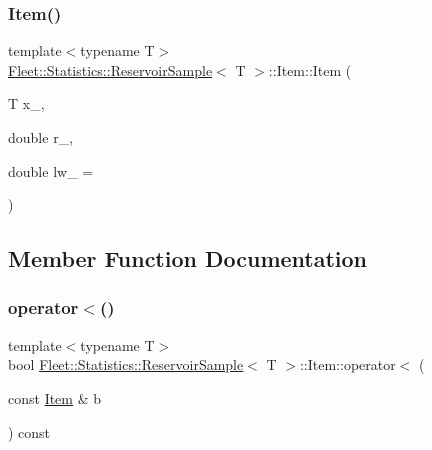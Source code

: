 \subsubsection{\texorpdfstring{Item()}{Item()}\hspace{0.1cm}{\footnotesize\ttfamily [2/2]}}
{\footnotesize\ttfamily template$<$typename T$>$ \\
\hyperlink{class_fleet_1_1_statistics_1_1_reservoir_sample}{Fleet\+::\+Statistics\+::\+Reservoir\+Sample}$<$ T $>$\+::Item\+::\+Item (\begin{DoxyParamCaption}\item[{T}]{x\+\_\+,  }\item[{double}]{r\+\_\+,  }\item[{double}]{lw\+\_\+ = {} }\end{DoxyParamCaption})\hspace{0.3cm}{\ttfamily [inline]}}



\subsection{Member Function Documentation}
\mbox{\label{class_fleet_1_1_statistics_1_1_reservoir_sample_1_1_item_a06bf92e43a3bfe61e75a8bf0d6fa2c67}} 
\subsubsection{\texorpdfstring{operator$<$()}{operator<()}\hspace{0.1cm}{\footnotesize\ttfamily [1/2]}}
{\footnotesize\ttfamily template$<$typename T$>$ \\
bool \hyperlink{class_fleet_1_1_statistics_1_1_reservoir_sample}{Fleet\+::\+Statistics\+::\+Reservoir\+Sample}$<$ T $>$\+::Item\+::operator$<$ (\begin{DoxyParamCaption}\item[{const \hyperlink{class_fleet_1_1_statistics_1_1_reservoir_sample_1_1_item}{Item} \&}]{b }\end{DoxyParamCaption}) const\hspace{0.3cm}{\ttfamily [inline]}}

